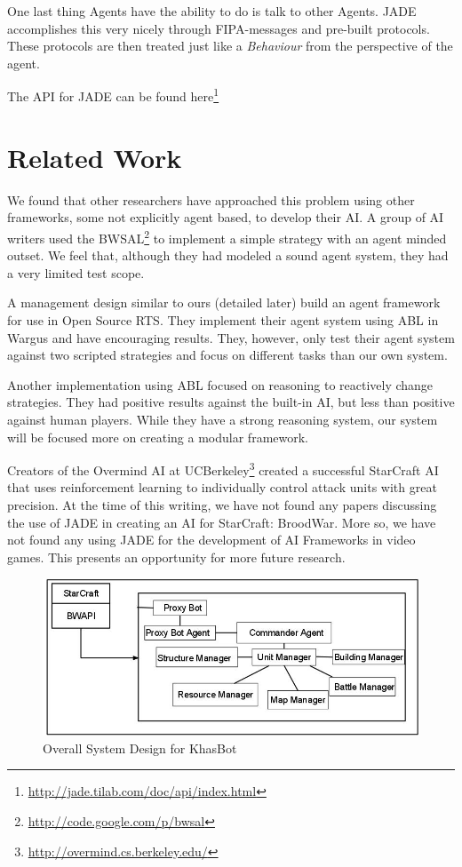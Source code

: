 \documentclass[letterpaper]{article}
\begin{document}
One last thing Agents have the ability to do is talk to other Agents.  JADE accomplishes this very nicely through FIPA-messages and pre-built protocols.  These protocols are then treated just like a \emph{Behaviour} from the perspective of the agent.

The API for JADE can be found here\footnote{\url{http://jade.tilab.com/doc/api/index.html}}

\section{Related Work}
We found that other researchers have approached this problem using other frameworks, some not explicitly agent based, to develop their AI.  A group of AI writers\cite{CrapPaper} used the BWSAL\footnote{\url{http://code.google.com/p/bwsal}} to implement a simple strategy with an agent minded outset.  We feel that, although they had modeled a sound agent system, they had a very limited test scope.

A management design similar to ours (detailed later) build an agent framework for use in Open Source RTS\cite{McCoy}.  They implement their agent system using ABL in Wargus and have encouraging results.  They, however, only test their agent system against two scripted strategies and focus on different tasks than our own system.  

Another implementation using ABL\cite{Weber} focused on reasoning to reactively change strategies.  They had positive results against the built-in AI, but less than positive against human players.  While they have a strong reasoning system, our system will be focused more on creating a modular framework.

Creators of the Overmind AI at UCBerkeley\footnote{\url{http://overmind.cs.berkeley.edu/}} created a successful StarCraft AI that uses reinforcement learning to individually control attack units with great precision.
At the time of this writing, we have not found any papers discussing the use of JADE in creating an AI for StarCraft: BroodWar.  More so, we have not found any using JADE for the development of AI Frameworks in video games.  This presents an opportunity for more future research.

\begin{figure}[htp]
\begin{center}
\includegraphics[scale=0.4]{AgentDesignFigure.jpg}
\caption{Overall System Design for KhasBot}
\label{fig:System}
\end{center}
\end{figure}
\end{document}
